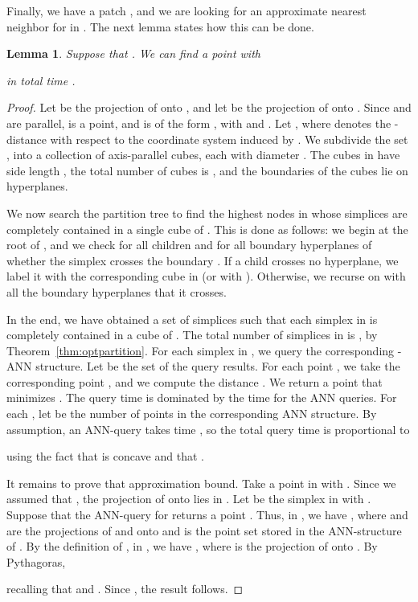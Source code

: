 \documentclass[a4paper,11pt]{paper}
\newtheorem{lemma}[theorem]{Lemma}
\begin{document}
Finally, we have a patch , and we are
looking for an approximate nearest neighbor for  in .
The next lemma states how this can be done.
\begin{lemma}\label{lem:patch_NN}
  Suppose that . We can find a point
     with
    
    in total time
    .
\end{lemma}
\begin{proof}
  Let  be the projection  of  onto , and let
   be the projection of  onto .
  Since  and  are parallel,
   is a point, and
   is of the form , with
   and .
  Let , where
   denotes the
  -distance with respect to the coordinate system induced
  by .
  We subdivide the set ,
  into a collection  of
  axis-parallel cubes, each with diameter
  .
  The cubes in 
  have side length ,
  the total number of cubes is
  , and the
  boundaries of the cubes lie on
   hyperplanes.

  We now search the partition tree 
  to find the highest nodes  in
    whose simplices  are completely contained
  in a single cube of .
  This is done as follows: we begin at the root
  of , and we check for all children 
  and for all boundary hyperplanes  of 
  whether the simplex  crosses the boundary .
  If a child  crosses no hyperplane, we label it
  with the corresponding cube in  (or with ).
  Otherwise, we recurse on 
  with all the boundary hyperplanes that it crosses.

  In the end, we have obtained a set  of simplices
  such that each simplex in  is completely contained in
  a cube of .
  The total number of simplices
  in  is , by
  Theorem~\ref{thm:optpartition}.
  For each simplex in ,
  we query the corresponding -ANN structure.
  Let  be the set of the query results.
  For each point , we take the corresponding point
  , and we compute the distance .
  We return a point  that minimizes .
  The query time is dominated by the time for the ANN queries.
  For each , let  be the number
  of points in the corresponding ANN structure. By
  assumption, an ANN-query takes time
  ,
  so the total query time is proportional to
  
  using the fact that  is concave and
  that .

  It remains to prove that approximation bound.
  Take a point  in  with . Since
  we assumed that , the projection
   of  onto  lies in .
  Let  be the simplex in  with
  . Suppose that the ANN-query for 
  returns a point .
  Thus, in , we have
  , where  and  are
  the projections of  and  onto  and
   is the point set stored in the ANN-structure of
  .
  By the definition of , in , we have
  ,
  where  is the projection of  onto .
  By Pythagoras,
  
  recalling that  and .
  Since ,
  the result follows.
\end{proof}
\end{document}
